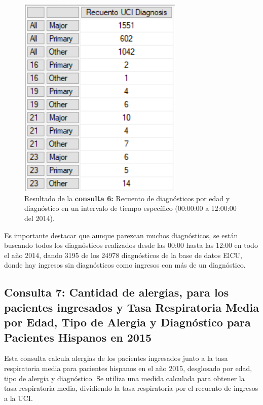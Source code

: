 \documentclass[12pt, a4paper, twoside]{article}
\begin{document}
	\begin{figure}[H]
		\centering
		\includegraphics[width=0.7\textwidth]{image/consulta6.png}
		\caption{Resultado de la \textbf{consulta 6:}  Recuento de diagnósticos por edad y diagnóstico en un intervalo de tiempo específico (00:00:00 a 12:00:00 del 2014).}
		\label{fig:consulta6}
	\end{figure}
	
	Es importante destacar que aunque parezcan muchos diagnósticos, se están buscando todos los diagnósticos realizados desde las 00:00 hasta las 12:00 en todo el año 2014, dando 3195 de los 24978 diagnósticos de la base de datos ElCU, donde hay ingresos sin diagnósticos como ingresos con más de un diagnóstico.
	
	\subsection{Consulta 7: Cantidad de alergias, para los pacientes ingresados y Tasa Respiratoria Media por Edad, Tipo de Alergia y Diagnóstico para Pacientes Hispanos en 2015}
	
	Esta consulta calcula alergias de los pacientes ingresados junto a  la tasa respiratoria media para pacientes hispanos en el año 2015, desglosado por edad, tipo de alergia y diagnóstico. Se utiliza una medida calculada para obtener la tasa respiratoria media, dividiendo la tasa respiratoria por el recuento de ingresos a la UCI.
	
\end{document}
